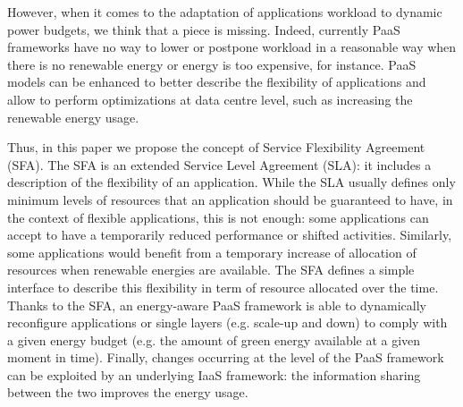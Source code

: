 However, when it comes to the adaptation of applications workload to dynamic power budgets, we think that a piece is missing.
Indeed, currently PaaS frameworks have no way to lower or postpone workload in a reasonable way when there is no renewable energy or energy is too expensive, for instance.
PaaS models can be enhanced to better describe the flexibility of applications and allow to perform optimizations at data centre level, such as increasing the renewable energy usage.

Thus, in this paper we propose the concept of Service Flexibility Agreement (SFA). 
The SFA is an extended Service Level Agreement (SLA): it includes a description of the flexibility of an application.
While the SLA usually defines only minimum levels of resources that an application should be guaranteed to have, in the context of flexible applications, this is not enough: some applications can accept to have a temporarily reduced performance or shifted activities.
Similarly, some applications would benefit from a temporary increase of allocation of resources when renewable energies are available.
The SFA defines a simple interface to describe this flexibility in term of resource allocated over the time. 
Thanks to the SFA, an energy-aware PaaS framework is able to dynamically reconfigure applications or single layers (e.g. scale-up and down) to comply with a given energy budget (e.g. the amount of green energy available at a given moment in time).
Finally, changes occurring at the level of the PaaS framework can be exploited by an underlying IaaS framework: the information sharing between the two improves the energy usage.





